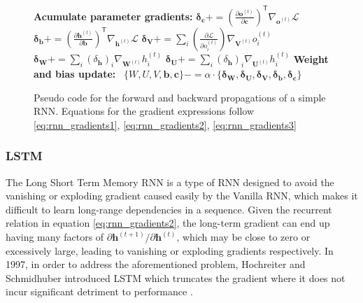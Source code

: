 \begin{figure}
\begin{algorithm}[H]
\begin{algorithmic}
                \State \textbf{Acumulate parameter gradients:}
                \State $\boldsymbol{\delta_c} += \left(\frac{\partial \mathbf{o}^{(t)}}{\partial\mathbf{c}}\right)^\mathsf{T}\nabla_{\mathbf{o}^{(t)}} \mathcal{L}$
                \State $\boldsymbol{\delta_b} += \left(\frac{\partial \mathbf{h}^{(t)}}{\partial\mathbf{b}}\right)^\mathsf{T}\nabla_{\mathbf{h}^{(t)}} \mathcal{L}$
                \State $\boldsymbol{\delta_V} +=\sum_{i} \left(\frac{\partial \mathcal{L}}{\partial o_{i}^{(t)}}\right)\nabla_{\mathbf{V}^{(t)}}o^{(t)}_{i}$
                \State $\boldsymbol{\delta_W} +=\sum_{i} \left( {\delta_{\mathbf{h}}}\right)_i\nabla_{\mathbf{W}^{(t)}}h^{(t)}_{i}$
                \State $\boldsymbol{\delta_U} +=\sum_{i} \left( {\delta_{\mathbf{h}}}\right)_i\nabla_{\mathbf{U}^{(t)}}h^{(t)}_{i}$
            \EndFor
            \State \textbf{Weight and bias update:}
            \State $\enspace \{W, U, V, \mathbf{b}, \mathbf{c} \}-= \alpha \cdot  \{\boldsymbol{\delta_W} , \boldsymbol{\delta_U} , \boldsymbol{\delta_V} , \boldsymbol{\delta_b} ,\boldsymbol{\delta_c} \}$
        \end{algorithmic}
    \end{algorithm}
    \caption*{Pseudo code for the forward and backward propagations of a simple RNN. Equations for the gradient expressions follow \eqref{eq:rnn_gradients1}, \eqref{eq:rnn_gradients2}, \eqref{eq:rnn_gradients3}}
\end{figure}


\subsubsection{LSTM}
The Long Short Term Memory RNN is a type of RNN designed to avoid the vanishing or exploding gradient caused easily by the Vanilla RNN, which makes it difficult to learn long-range dependencies in a sequence.  Given the recurrent relation in equation \eqref{eq:rnn_gradients2}, the long-term gradient can end up having many factors of $\partial \mathbf{h}^{(t+1)}/\partial\mathbf{h}^{(t)}$, which may be close to zero or excessively large, leading to vanishing or exploding gradients respectively. In 1997, in order to address the aforementioned problem, Hochreiter and Schmidhuber introduced LSTM which truncates the gradient where it does not incur significant detriment to performance \cite{Hochreiter97}.

